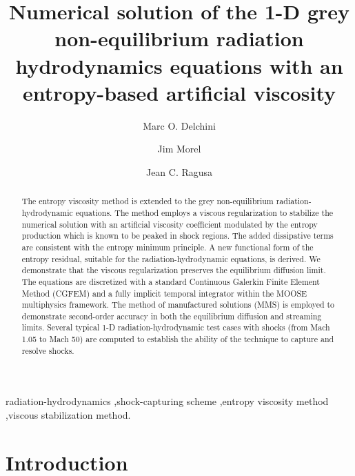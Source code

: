 \documentclass[review]{elsarticle}
\begin{document}
%
\begin{frontmatter}
%
\title{Numerical solution of the 1-D grey non-equilibrium radiation hydrodynamics equations with an entropy-based artificial viscosity}
\author{Marc O. Delchini}

\author{Jim Morel}

\author{Jean C. Ragusa}

\address[label1]{Department of Nuclear Engineering, Texas A\&M University, College Station, TX 77843, USA }

\begin{abstract}
The entropy viscosity method is extended to the grey non-equilibrium radiation-hydrodynamic equations. 
The method employs a viscous regularization to stabilize the numerical solution with an artificial viscosity coefficient modulated by the entropy production which is known to be peaked in shock regions. The added dissipative terms are consistent with the entropy minimum principle.  A new functional form of the entropy residual, suitable for the radiation-hydrodynamic equations, is derived. We demonstrate that the viscous regularization preserves the equilibrium diffusion limit. The equations are discretized with a standard Continuous Galerkin Finite Element Method (CGFEM) and a fully implicit temporal integrator within the MOOSE multiphysics framework. The method of manufactured solutions (MMS) is employed to demonstrate second-order accuracy in both the equilibrium diffusion and streaming limits. Several typical 1-D radiation-hydrodynamic test cases with shocks (from Mach 1.05 to Mach 50) are computed to establish the ability of the technique to capture and resolve shocks.
\end{abstract}
%
\begin{keyword}
radiation-hydrodynamics \sep shock-capturing scheme \sep entropy viscosity method \sep viscous stabilization method.
\end{keyword}
%
\end{frontmatter}
%
\linenumbers
%
\section{Introduction}
\label{sec:section1}
\end{document}
